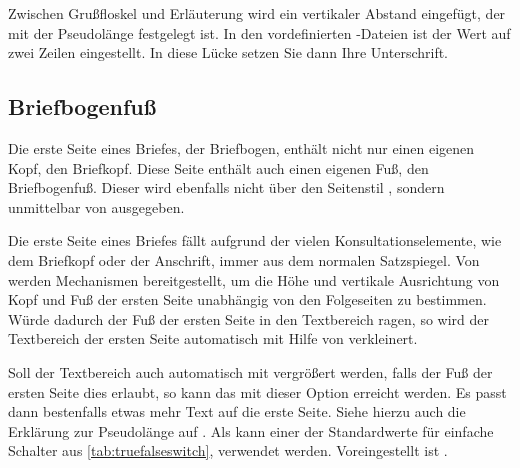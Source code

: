 Zwischen Grußfloskel und Erläuterung wird ein vertikaler Abstand eingefügt,
der mit der Pseudolänge  festgelegt ist. In den
vordefinierten -Dateien ist der Wert auf
zwei Zeilen eingestellt. In diese Lücke setzen Sie dann Ihre Unterschrift.%
\iffalse%
\ Sollten\textnote{Tipp!} Sie sich dazu entschließen in die Variable
\DescRef{\LabelBase.variable.signature}\IndexVariable{signature}%
\important{\DescRef{\LabelBase.variable.signature}} mit Paket
\Package{graphicx}\IndexPackage{graphicx} ein Faksimile Ihrer Unterschrift
einzufügen, wäre es also sinnvoll den Wert von \PLength{sigbeforevskip} und
damit die Lücke zwischen Schlussgruß und Signatur zu verringern.%
\fi%
\EndIndexGroup
% 
\EndIndexGroup


\subsection{Briefbogenfuß}
%
\BeginIndexGroup
{}%

Die erste Seite eines Briefes, der Briefbogen, enthält nicht nur einen eigenen
Kopf, den Briefkopf. Diese Seite enthält auch einen eigenen
Fuß, den Briefbogenfuß. %
\iftrue%
Dieser wird ebenfalls nicht über den Seitenstil%
\else%
Genau wie der Briefkopf wird der Briefbogenfuß nicht über den Seitenstil%
\fi%
, sondern unmittelbar von %
 ausgegeben.


\begin{Declaration}
\end{Declaration}
\begin{Explain}
  Die erste Seite eines Briefes fällt %
  \iftrue %
    aufgrund der vielen Konsultationselemente, wie dem Briefkopf oder der
    Anschrift,
  \fi %
  immer aus dem normalen Satzspiegel. Von \KOMAScript{} werden Mechanismen
  bereitgestellt, um die Höhe und vertikale Ausrichtung von Kopf und Fuß der
  ersten Seite unabhängig von den Folgeseiten zu bestimmen. Würde dadurch der
  Fuß der ersten Seite in den Textbereich ragen, so wird
  der Textbereich der ersten Seite automatisch mit Hilfe von
   verkleinert. 
\end{Explain}
Soll der Textbereich auch automatisch mit  vergrößert
werden, falls der Fuß der ersten Seite dies erlaubt, so kann das mit dieser
Option erreicht werden. Es passt dann bestenfalls etwas mehr Text auf die
erste Seite.  Siehe hierzu auch die Erklärung zur Pseudolänge
 auf
. Als  kann
einer der Standardwerte für einfache Schalter aus
\autoref{tab:truefalseswitch},  verwendet
werden. Voreingestellt ist
.%
\EndIndexGroup


